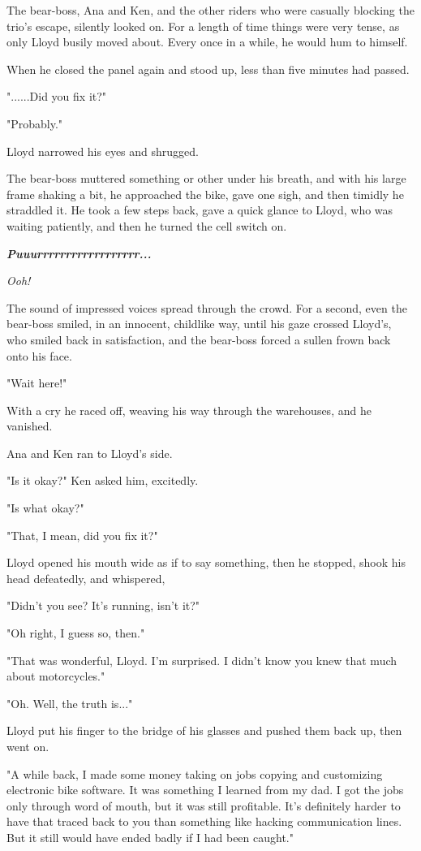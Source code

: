 \documentclass[
]{article}
\begin{document}
The bear-boss, Ana and Ken, and the other riders who were casually
blocking the trio's escape, silently looked on. For a length of time
things were very tense, as only Lloyd busily moved about. Every once in
a while, he would hum to himself.

When he closed the panel again and stood up, less than five minutes had
passed.

"......Did you fix it?"

"Probably."

Lloyd narrowed his eyes and shrugged.

The bear-boss muttered something or other under his breath, and with his
large frame shaking a bit, he approached the bike, gave one sigh, and
then timidly he straddled it. He took a few steps back, gave a quick
glance to Lloyd, who was waiting patiently, and then he turned the cell
switch on.

\emph{\textbf{Puuurrrrrrrrrrrrrrrrrr...}}

\emph{Ooh!}

The sound of impressed voices spread through the crowd. For a second,
even the bear-boss smiled, in an innocent, childlike way, until his gaze
crossed Lloyd's, who smiled back in satisfaction, and the bear-boss
forced a sullen frown back onto his face.

"Wait here!"

With a cry he raced off, weaving his way through the warehouses, and he
vanished.

Ana and Ken ran to Lloyd's side.

"Is it okay?" Ken asked him, excitedly.

"Is what okay?"

"That, I mean, did you fix it?"

Lloyd opened his mouth wide as if to say something, then he stopped,
shook his head defeatedly, and whispered,

"Didn't you see? It's running, isn't it?"

"Oh right, I guess so, then."

"That was wonderful, Lloyd. I'm surprised. I didn't know you knew that
much about motorcycles."

"Oh. Well, the truth is..."

Lloyd put his finger to the bridge of his glasses and pushed them back
up, then went on.

"A while back, I made some money taking on jobs copying and customizing
electronic bike software. It was something I learned from my dad. I got
the jobs only through word of mouth, but it was still profitable. It's
definitely harder to have that traced back to you than something like
hacking communication lines. But it still would have ended badly if I
had been caught."
\end{document}
